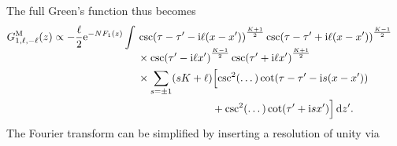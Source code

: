 \documentclass[english, parskip=full]{scrartcl}
\begin{document}
The full Green's function thus becomes
\begin{align}
G_{1,\ell,-\ell}^\M(z) &\propto -\frac{\ell}{2} \powe{-NF_1(z)} \int \bsplit{& \csc\kla*{\tau - \tau' - \i \ell (x-x')}^{\frac{K+1}{2}} \csc\kla*{\tau - \tau' + \i \ell (x-x')}^{\frac{K-1}{2}} \\
&\times \csc\kla*{\tau' - \i \ell x'}^{\frac{K-1}{2}} \csc\kla*{\tau' + \i \ell x'}^{\frac{K+1}{2}}\\
&\times \sum_{s=\pm 1} \kla*{sK+\ell} \klb[\Big]{ \csc^2(\dots) \cot\kla*{\tau - \tau' - \i s(x-x')} \\
&\qquad\qquad\qquad\quad + \csc^2(\dots) \cot\kla*{\tau' + \i sx'}}\,\d z'.}
\end{align}
The Fourier transform can be simplified by inserting a resolution of unity via
\end{document}
